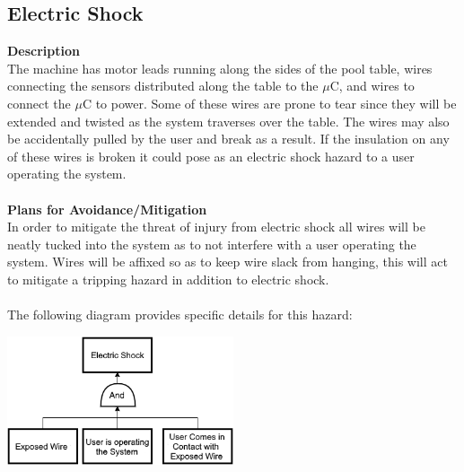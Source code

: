 \documentclass[titlepage]{article}
\begin{document}
\subsection{Electric Shock}
\textbf{Description}\\
The machine has motor leads running along the sides of the pool table, wires connecting the sensors distributed along the table to the $\mu$C, and wires to connect the $\mu$C to power. Some of these wires are prone to tear since they will be extended and twisted as the system traverses over the table. The wires may also be accidentally pulled by the user and break as a result. If the insulation on any of these wires is broken it could pose as an electric shock hazard to a user operating the system.\\~\\
\textbf{Plans for Avoidance/Mitigation}\\
In order to mitigate the threat of injury from electric shock all wires will be neatly tucked into the system as to not interfere with a user operating the system. Wires will be affixed so as to keep wire slack from hanging, this will act to mitigate a tripping hazard in addition to electric shock.\\~\\
The following diagram provides specific details for this hazard:
\begin{center}
	\includegraphics[width=0.5\textwidth]{ElectricShockFTA.png}
\label{fig:yRailFig}
\end{center}

\newpage
\end{document}
